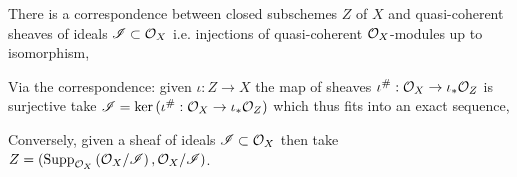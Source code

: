 \documentclass[12pt]{article}
\begin{document}
\begin{theorem}
There is a correspondence between closed subschemes $Z$ of $X$ and quasi-coherent sheaves of ideals $\mathscr{I} \subset \mathcal{O}_{X}$ i.e. injections of quasi-coherent $\mathcal{O}_{X}$-modules up to isomorphism,
\begin{center}
\end{center}
Via the correspondence: given $\iota : Z \to X$ the map of sheaves $\iota^\# : \mathcal{O}_{X} \to \iota_* \mathcal{O}_{Z}$ is surjective take $\mathscr{I} = \ker{(\iota^\# : \mathcal{O}_{X} \to \iota_* \mathcal{O}_{Z})}$ which thus fits into an exact sequence,
\begin{center}
\end{center}
Conversely, given a sheaf of ideals $\mathscr{I} \subset \mathcal{O}_{X}$ then take $Z = (\mathrm{Supp}_{\mathcal{O}_{X}}\left(\mathcal{O}_{X} / \mathscr{I} \right), \mathcal{O}_{X} / \mathscr{I})$.
\end{theorem}
\end{document}
